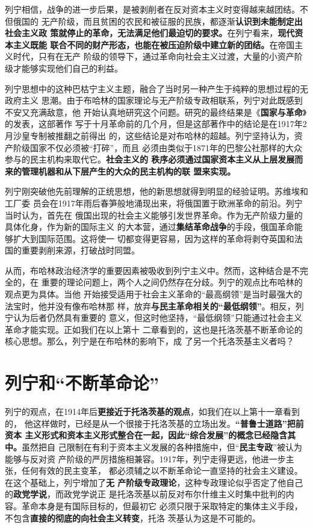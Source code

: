 列宁相信，战争的进一步后果，是被剥削者在反对资本主义时变得越来越团结。不但俄国的
无产阶级，而且贫困的农民和被征服的民族，都逐渐\textbf{认识到未能制定出社会主义政
  策就停止的革命，无法满足他们最迫切的要求。}在列宁看来，\textbf{现代资本主义既能
  联合不同的财产形态，也能在被压迫阶级中建立新的团结。}在帝国主义时代，只有在无产
阶级的领导下，通过革命向社会主义过渡，大量的小资产阶级才能够实现他们自己的利益。

列宁思想中的这种巴枯宁主义主题，融合了当时另一种产生于纯粹的思想过程的无政府主义
思潮。由于布哈林的国家理论与无产阶级专政相联系，列宁对此既感到不安又充满敌意，他
开始认真地研究这个问题。研究的最终结果是《\textbf{国家与革命}》的发表，这部著作
写于十月革命前的几个月，但是这部著作中的结论是在1917年2月沙皇专制被推翻之前得出
的，这些结论是对布哈林的超越。列宁坚持认为，资产阶级国家不仅必须被“打碎”，而且
必须由类似于1871年的巴黎公社那样的大众参与的民主机构来取代它。\textbf{社会主义的
秩序必须通过国家资本主义从上层发展而来的管理机器和从下层产生的大众的民主机构的联
盟来实现。}

列宁刚突破他先前理解的正统思想，他的新思想就得到明显的经验证明。苏维埃和工厂委
员会在1917年雨后春笋般地涌现出来，将俄国置于欧洲革命的前沿。列宁当时认为，首先在
俄国出现的社会主义能够引发世界革命。作为无产阶级力量的具体化身，作为新的国际主义
的大本营，通过\textbf{集结革命战争}的手段，俄国革命能够扩大到国际范围。这将使一
切都变得更容易，因为这样的革命将剥夺英国和法国的重要剥削来源，打破战时同盟。

从而，布哈林政治经济学的重要因素被吸收到列宁主义中。然而，这种结合是不完全的，在
重要的理论问题上，两个人之间仍然存在分歧。列宁的观点比布哈林的观点更为具体。当他
开始接受适用于社会主义革命的“最高纲领”是当时最强大的法宝时，他并没有像布哈林那
样，放弃\textbf{与民主革命相关的“最低纲领”}。相反，列宁认为后者仍然具有重要的
意义，但这时他坚持，“最低纲领”只能通过社会主义革命才能实现。正如我们在以上第十
二章看到的，这也是托洛茨基不断革命论的核心思想。那么，列宁是在布哈林的影响下，成
了另一个托洛茨基主义者吗？


\section{列宁和“不断革命论”}

列宁的观点，在1914年后\textbf{更接近于托洛茨基的观点}，如我们在以上第十一章看到的，
他这样做时，已经是从一个很接于托洛茨基的立场出发。\textbf{“普鲁士道路”把前资本
  主义形式和资本主义形式整合在一起，因此“综合发展”的概念已经隐含其中。}虽然把自
己限制在有利于资本主义发展的各种措施中，但“\textbf{民主专政}”被认为能够与反对资
产阶级的严厉措施相兼容。1917年，列宁走得更远，他进一步主张，任何有效的民主变革，
都必须辅之以不断革命论一直坚持的社会主义建设。在这个基础上，列宁增加了\textbf{无
  产阶级专政理论}，这种专政理论似乎否定了他自己的\textbf{政党学说}，而政党学说正
是托洛茨基以前反对布尔什维主义时集中批判的内容。革命本身是有国际目标的，但最初它
必须只限于采取特定的集体主义手段，不包含\textbf{直接的彻底的向社会主义转变}，托洛
茨基认为这是不可能的。


